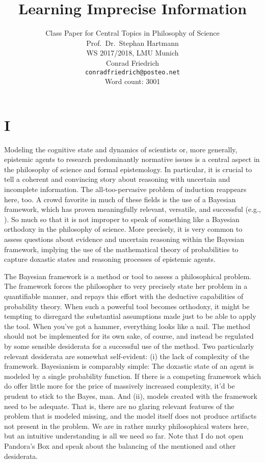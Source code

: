 \documentclass[11pt, a4paper]{scrartcl}
\title{\osfamily{}Learning Imprecise Information}
\author{Class Paper for Central Topics in Philosophy of Science \\ Prof.\ Dr.\ Stephan Hartmann \\ WS 2017/2018, LMU Munich \\ Conrad Friedrich \\ \texttt{conradfriedrich@posteo.net} \\ Word count: 3001}
\begin{document}
\maketitle
\thispagestyle{empty}
\newpage
\section{I}
Modeling the cognitive state and dynamics of scientists or, more generally, epistemic agents to research predominantly normative issues is a central aspect in the philosophy of science and formal epistemology. In particular, it is crucial to tell a coherent and convincing story about reasoning with uncertain and incomplete information. The all-too-pervasive problem of induction reappears here, too. A crowd favorite in much of these fields is the use of a Bayesian framework, which has proven meaningfully relevant, versatile, and successful (e.g.\citet{Bovens2003-HARBE}, \citet{Hartmann2017}). So much so that it is not improper to speak of something like a Bayesian orthodoxy in the philosophy of science. More precisely, it is very common to assess questions about evidence and uncertain reasoning within the Bayesian framework, implying the use of the mathematical theory of probabilities to capture doxastic states and reasoning processes of epistemic agents.

The Bayesian framework is a method or tool to assess a philosophical problem. The framework forces the philosopher to very precisely state her problem in a quantifiable manner, and repays this effort with the deductive capabilities of probability theory. When such a powerful tool becomes orthodoxy, it might be tempting to disregard the substantial assumptions made just to be able to apply the tool. When you've got a hammer, everything looks like a nail. The method should not be implemented for its own sake, of course, and instead be regulated by some sensible desiderata for a successful use of the method. Two particularly relevant desiderata are somewhat self-evident: (i) the lack of complexity of the framework. Bayesianism is comparably simple: The doxastic state of an agent is modeled by a single probability function. If there is a competing framework which do offer little more for the price of massively increased complexity, it'd be prudent to stick to the Bayes, man. And (ii), models created with the framework need to be adequate. That is, there are no glaring relevant features of the problem that is modeled missing, and the model itself does not produce artifacts not present in the problem. We are in rather murky philosophical waters here, but an intuitive understanding is all we need so far. Note that I do not open Pandora's Box and speak about the balancing of the mentioned and other desiderata.
\end{document}
